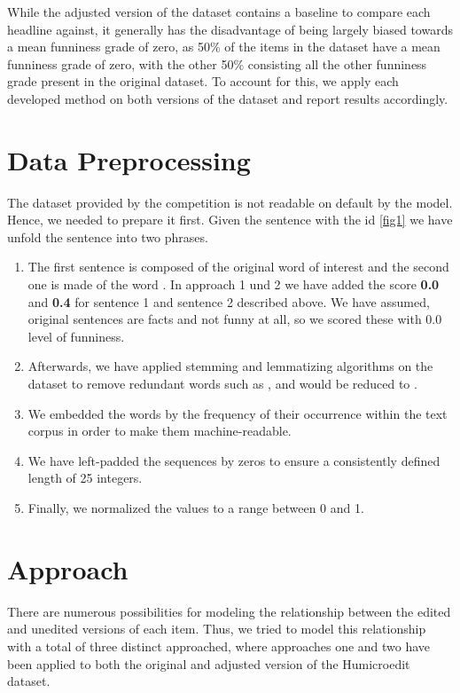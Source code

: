 \documentclass[11pt,a4paper]{article}
\begin{document}
While the adjusted version of the dataset contains a baseline to compare each headline against, it generally has the disadvantage of being largely biased towards a mean funniness grade of zero, as 50\% of the items in the dataset have a mean funniness grade of zero, with the other 50\% consisting all the other funniness grade present in the original dataset. To account for this, we apply each developed method on both versions of the dataset and report results accordingly.

\section{Data Preprocessing}
\label{sec:data-preprocessing}
The dataset provided by the competition is not readable on default by the model. Hence, we needed to prepare it first. Given the sentence with the id  \ref{fig1}  we have unfold the sentence into two phrases. \begin{enumerate}
    \item The first sentence is composed of the original word of interest  and the second one is made of the word . In approach 1 und 2 we have added the score \textbf{0.0} and \textbf{0.4} for sentence 1 and sentence 2 described above. We have assumed, original sentences are facts and not funny at all, so we scored these with 0.0 level of funniness.
    \item Afterwards, we have applied stemming and lemmatizing algorithms on the dataset to remove redundant words such as ,  and  would be reduced to .
    \item   We embedded the words by the frequency of their occurrence within the text corpus in order to make them machine-readable.
    \item We have left-padded the sequences by zeros to ensure a consistently defined length of 25 integers.
    \item Finally, we normalized the values to a range between 0 and 1.
\end{enumerate}

\section{Approach}
There are numerous possibilities for modeling the relationship between the edited and unedited versions of each item. Thus, we tried to model this relationship with a total of three distinct approached, where approaches one and two have been applied to both the original and adjusted version of the Humicroedit dataset. 
\end{document}
